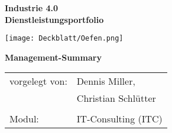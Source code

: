 \thispagestyle{plain}
\begin{titlepage}

\begin{center}



\vspace{2cm}

\Huge{\textbf{Industrie 4.0}}\\[1.5ex]
\Large{\textbf{Dienstleistungsportfolio}}

\vspace{2cm}

\texttt{[image: Deckblatt/Oefen.png]}

\vspace{2cm}

\large{\textbf{Management-Summary}}\\[3.0ex]

\normalsize
\begin{tabular}{ll}\\
	vorgelegt von: 
	& \quad Dennis Miller, \\[1.2ex]
	& \quad Christian Schlütter\\[1.2ex]
	& \quad \\[1.2ex]
	Modul:  & \quad IT-Consulting (ITC) \\[1.2ex]
\end{tabular}

\end{center}

\end{titlepage}
